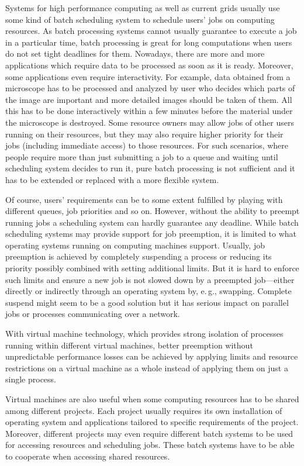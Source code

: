 \documentclass[times,10pt,twocolumn]{article}
\begin{document}

Systems for high performance computing as well as current grids usually use
some kind of batch scheduling system to schedule users' jobs on computing
resources. As batch processing systems cannot usually guarantee to execute a
job in a particular time, batch processing is great for long computations when
users do not set tight deadlines for them. Nowadays, there are more and more
applications which require data to be processed as soon as it is ready.
Moreover, some applications even require interactivity. For example, data
obtained from a microscope has to be processed and analyzed by user who
decides which parts of the image are important and more detailed images should
be taken of them. All this has to be done interactively within a few minutes
before the material under the microscope is destroyed. Some resource owners
may allow jobs of other users running on their resources, but they may also
require higher priority for their jobs (including immediate access) to those
resources. For such scenarios, where people require more than just submitting
a job to a queue and waiting until scheduling system decides to run it, pure
batch processing is not sufficient and it has to be extended or replaced with
a more flexible system.

Of course, users' requirements can be to some extent fulfilled by playing with
different queues, job priorities and so on. However, without the ability to
preempt running jobs a scheduling system can hardly guarantee any deadline.
While batch scheduling systems may provide support for job preemption, it is
limited to what operating systems running on computing machines support.
Usually, job preemption is achieved by completely suspending a process or
reducing its priority possibly combined with setting additional limits. But it
is hard to enforce such limits and ensure a new job is not slowed down by a
preempted job---either directly or indirectly through an operating system by,
e.\,g., swapping. Complete suspend might seem to be a good solution but it has
serious impact on parallel jobs or processes communicating over a network.

With virtual machine technology, which provides strong isolation of processes
running within different virtual machines, better preemption without
unpredictable performance losses can be achieved by applying limits and
resource restrictions on a virtual machine as a whole instead of applying them
on just a single process.

Virtual machines are also useful when some computing resources has to be
shared among different projects. Each project usually requires its own
installation of operating system and applications tailored to specific
requirements of the project. Moreover, different projects may even require
different batch systems to be used for accessing resources and scheduling
jobs. These batch systems have to be able to cooperate when accessing shared
resources.
\end{document}
